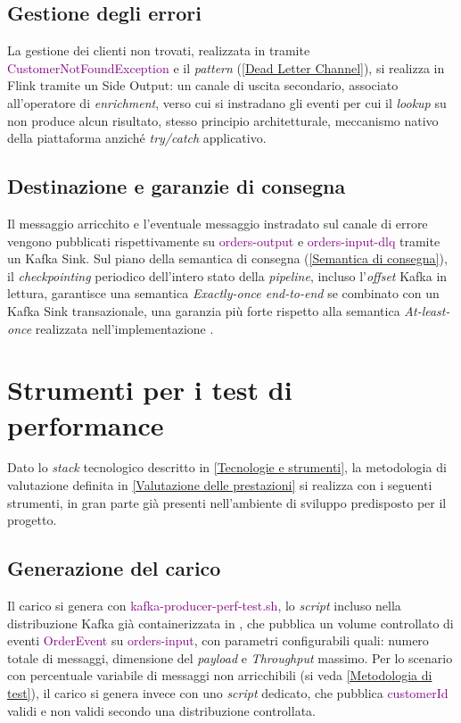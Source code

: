 \newpage
\subsection{Gestione degli errori}
\label{Gestione degli errori}
La gestione dei clienti non trovati, realizzata in  tramite \textcolor{purple}{CustomerNotFoundException} e il \textit{pattern}  (\ref{Dead Letter Channel}), si realizza in Flink tramite un \gls{Side Output}: un canale di uscita secondario, associato all'operatore di \textit{enrichment}, verso cui si instradano gli eventi per cui il \textit{lookup} su  non produce alcun risultato, stesso principio architetturale, meccanismo nativo della piattaforma anziché \textit{try/catch} applicativo.

\subsection{Destinazione e garanzie di consegna}
\label{Destinazione e garanzie di consegna}
Il messaggio arricchito e l'eventuale messaggio instradato sul canale di errore vengono pubblicati rispettivamente su \textcolor{purple}{orders-output} e \textcolor{purple}{orders-input-dlq} tramite un \gls{Kafka Sink}. 
Sul piano della semantica di consegna (\ref{Semantica di consegna}), il \textit{checkpointing} periodico dell'intero stato della \textit{pipeline}, incluso l'\textit{offset} Kafka in lettura, garantisce una semantica \textit{Exactly-once end-to-end} se combinato con un Kafka Sink transazionale, una garanzia più forte rispetto alla semantica \textit{At-least-once} realizzata nell'implementazione .

\section{Strumenti per i test di performance}
\label{Strumenti per i test di performance}
Dato lo \textit{stack} tecnologico descritto in \ref{Tecnologie e strumenti}, la metodologia di valutazione definita in \ref{Valutazione delle prestazioni} si realizza con i seguenti strumenti, in gran parte già presenti nell'ambiente di sviluppo predisposto per il progetto.

\subsection{Generazione del carico}
Il carico si genera con \textcolor{purple}{kafka-producer-perf-test.sh}, lo \textit{script} incluso nella distribuzione Kafka già containerizzata in , che pubblica un volume controllato di eventi \textcolor{purple}{OrderEvent} su \textcolor{purple}{orders-input}, con parametri configurabili quali: numero totale di messaggi, dimensione del \textit{payload} e \textit{\gls{Throughput}} massimo. 
Per lo scenario con percentuale variabile di messaggi non arricchibili (si veda \ref{Metodologia di test}), il carico si genera invece con uno \textit{script} dedicato, che pubblica \textcolor{purple}{customerId} validi e non validi secondo una distribuzione controllata.

